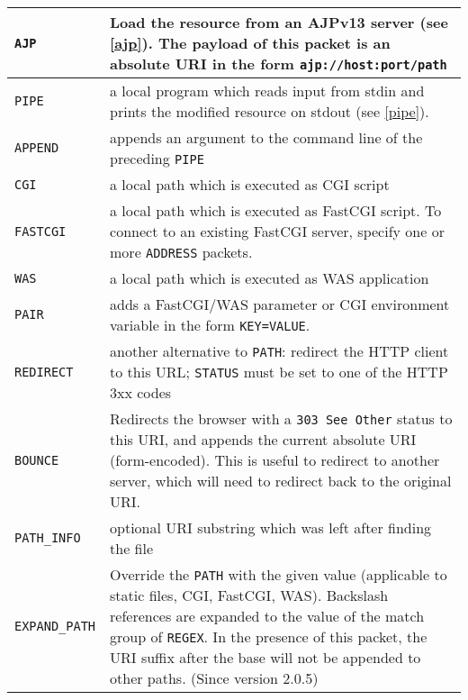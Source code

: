 \documentclass[a4paper,12pt]{article}
\begin{document}
\begin{longtable}{|l|p{8cm}|}
\hline

\verb|AJP| & Load the resource from an AJPv13 server (see
\ref{ajp}).  The payload of this packet is an absolute URI in the form
\texttt{ajp://host:port/path} \\

\hline

\verb|PIPE| & a local program which reads input from stdin and
prints the modified resource on stdout (see \ref{pipe}). \\

\hline

\verb|APPEND| & appends an argument to the command line of the
preceding \verb|PIPE| \\

\hline

\verb|CGI| & a local path which is executed as CGI script \\

\hline

\verb|FASTCGI| & a local path which is executed as FastCGI script.
To connect to an existing FastCGI server, specify one or more
\verb|ADDRESS| packets. \\

\hline

\verb|WAS| & a local path which is executed as WAS application \\

\hline

\verb|PAIR| & adds a FastCGI/WAS parameter or CGI environment
variable in the form \texttt{KEY=VALUE}. \\

\hline

\verb|REDIRECT| & another alternative to \verb|PATH|: redirect the
HTTP client to this URL; \verb|STATUS| must be set to one of the
HTTP 3xx codes \\

\hline

\verb|BOUNCE| & Redirects the browser with a \texttt{303 See Other}
status to this URI, and appends the current absolute URI
(form-encoded).  This is useful to redirect to another server, which
will need to redirect back to the original URI. \\

\hline

\verb|PATH_INFO| & optional URI substring which was left after
finding the file \\

\hline

\verb|EXPAND_PATH| & Override the \verb|PATH| with the given value
(applicable to static files, CGI, FastCGI, WAS).  Backslash references
are expanded to the value of the match group of \verb|REGEX|. In the
presence of this packet, the URI suffix after the base will not be
appended to other paths.
\scriptsize{(Since version 2.0.5)} \\


\end{longtable}
\end{document}
